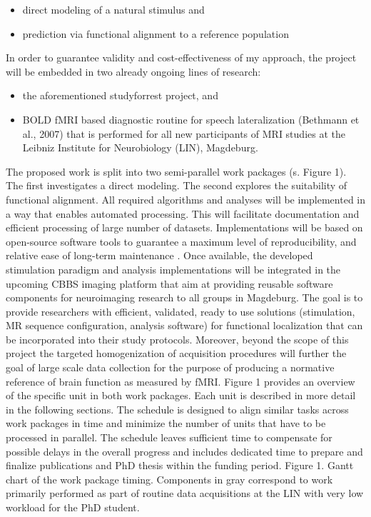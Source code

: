 \begin{itemize}
    \item direct modeling of a natural stimulus and
    \item prediction via functional alignment to a reference population
\end{itemize}

In order to guarantee validity and cost-effectiveness of
my approach, the project will be embedded in two already ongoing lines of
research:

\begin{itemize}
    \item the aforementioned studyforrest project, and
    \item BOLD fMRI based diagnostic routine for speech lateralization (Bethmann
        et al., 2007) that is performed for all new participants of MRI studies
        at the Leibniz Institute for Neurobiology (LIN), Magdeburg.
\end{itemize}

The proposed work is split into two semi-parallel work packages (s. Figure 1).
%
The first investigates a direct modeling.
%
The second explores the suitability of functional alignment.
%
All required algorithms and analyses will be implemented in a way that enables
automated processing.
%
This will facilitate documentation and efficient processing of large number of
datasets.
%
Implementations will be based on open-source software tools to guarantee a
maximum level of reproducibility, and relative ease of long-term maintenance
\citep{eglen2017toward}.
%
Once available, the developed stimulation paradigm and analysis implementations
will be integrated in the upcoming CBBS imaging platform that aim at providing
reusable software components for neuroimaging research to all groups in
Magdeburg.
%
The goal is to provide researchers with efficient, validated, ready to use
solutions (stimulation, MR sequence configuration, analysis software) for
functional localization that can be incorporated into their study protocols.
%
Moreover, beyond the scope of this project the targeted homogenization of
acquisition procedures will further the goal of large scale data collection for
the purpose of producing a normative reference of brain function as measured by
fMRI.
%
Figure 1 provides an overview of the specific unit in both work packages.
%
Each unit is described in more detail in the following sections.
%
The schedule is designed to align similar tasks across work packages in time and
minimize the number of units that have to be processed in parallel.
%
The schedule leaves sufficient time to compensate for possible delays in the
overall progress and includes dedicated time to prepare and finalize
publications and PhD thesis within the funding period.
%
Figure 1. Gantt chart of the work package timing.
%
Components in gray correspond to work primarily performed as part of routine
data acquisitions at the LIN with very low workload for the PhD student.

